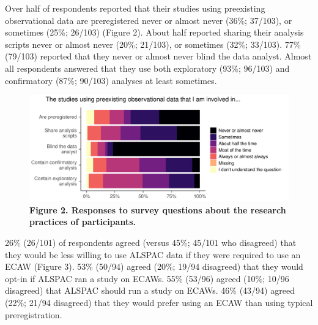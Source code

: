 \documentclass[
  man,floatsintext]{apa6}
\begin{document}
Over half of respondents reported that their studies using preexisting observational data are preregistered never or almost never (36\%; 37/103), or sometimes (25\%; 26/103) (Figure 2). About half reported sharing their analysis scripts never or almost never (20\%; 21/103), or sometimes (32\%; 33/103). 77\% (79/103) reported that they never or almost never blind the data analyst. Almost all respondents answered that they use both exploratory (93\%; 96/103) and confirmatory (87\%; 90/103) analyses at least sometimes.

\begin{figure}

{\centering \includegraphics[width=1\linewidth]{figs/methodPlot-1} 

}

\caption{\textbf{Figure 2. Responses to survey questions about the research practices of participants.}}\label{fig:methodPlot}
\end{figure}



26\% (26/101) of respondents agreed (versus 45\%; 45/101 who disagreed) that they would be less willing to use ALSPAC data if they were required to use an ECAW (Figure 3). 53\% (50/94) agreed (20\%; 19/94 disagreed) that they would opt-in if ALSPAC ran a study on ECAWs. 55\% (53/96) agreed (10\%; 10/96 disagreed) that ALSPAC should run a study on ECAWs. 46\% (43/94) agreed (22\%; 21/94 disagreed) that they would prefer using an ECAW than using typical preregistration.
\end{document}
